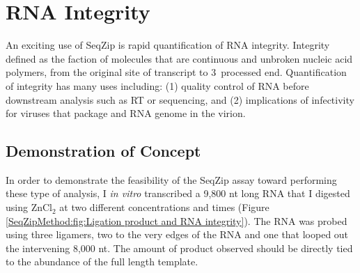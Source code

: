 \section{RNA Integrity}
  \label{SeqZipMethod:sec:RNA Integrity via SeqZip}

  An exciting use of SeqZip is rapid quantification of RNA integrity. Integrity defined as the faction of molecules that are continuous and unbroken nucleic acid polymers, from the original site of transcript to 3\textprime~processed end. Quantification of integrity has many uses including: (1) quality control of RNA before downstream analysis such as RT or sequencing, and (2) implications of infectivity for viruses that package and RNA genome in the virion.

  \subsection{Demonstration of Concept}
    \label{SeqZipMethod:subsec:SeqZip can be used to examine viral genomes}

    In order to demonstrate the feasibility of the SeqZip assay toward performing these type of analysis, I \textit{in vitro} transcribed a 9,800 nt long RNA that I digested using ZnCl$_{2}$ at two different concentrations and times (Figure \ref{SeqZipMethod:fig:Ligation product and RNA integrity}). The RNA was probed using three ligamers, two to the very edges of the RNA and one that looped out the intervening 8,000 nt. The amount of product observed should be directly tied to the abundance of the full length template.

